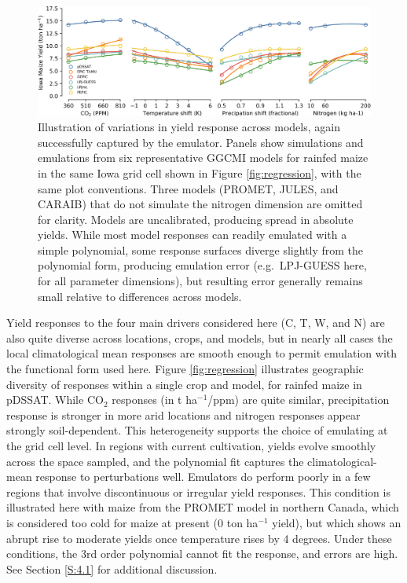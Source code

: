 \documentclass[gmd, manuscript]{copernicus} %
\begin{document}
\begin{figure}[h!!]
\centering
    \includegraphics[width=16.3cm]{figures/regression_example_2.png}
    \caption{
    Illustration of variations in yield response across models, again successfully captured by the emulator. 
    Panels show simulations and emulations from six representative GGCMI models for rainfed maize in the same Iowa grid cell shown in Figure \ref{fig:regression}, with the same plot conventions. 
    Three models (PROMET, JULES, and CARAIB) that do not simulate the nitrogen dimension are omitted for clarity. 
    Models are uncalibrated, producing spread in absolute yields. 
	While most model responses can readily emulated with a simple polynomial, some response surfaces diverge slightly from the polynomial form, producing emulation error (e.g.\ LPJ-GUESS here, for all parameter dimensions), but 
    resulting error generally remains small relative to differences across models.
    }
   \label{fig:regression_2}
\end{figure}

Yield responses to the four main drivers considered here (C, T, W, and N) are also quite diverse across locations, crops, and models, but in nearly all cases the local climatological mean responses are smooth enough to permit emulation with the functional form used here.
Figure \ref{fig:regression} illustrates geographic diversity of responses within a single crop and model, for rainfed maize in pDSSAT. While CO$_2$ responses (in t ha$^{-1}$/ppm) are quite similar, precipitation response is stronger in more arid locations and nitrogen responses appear strongly soil-dependent. This heterogeneity supports the choice of emulating at the grid cell level. 
In regions with current cultivation, yields evolve smoothly across the space sampled, and the polynomial fit captures the climatological-mean response to perturbations well. 
Emulators do perform poorly in a few regions that involve discontinuous or irregular yield responses. 
This condition is illustrated here with maize from the PROMET model in northern Canada, which is considered too cold for maize at present (0 ton ha$^{-1}$ yield), but which shows an abrupt rise to moderate yields once temperature rises by 4 degrees. 
Under these conditions, the 3rd order polynomial cannot fit the response, and errors are high. See Section \ref{S:4.1} for additional discussion. 
\end{document}
